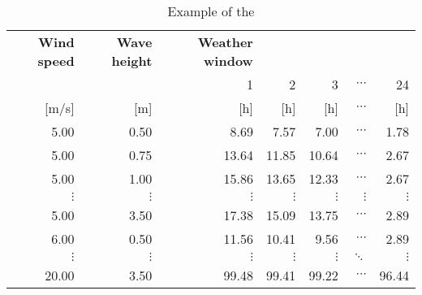 \begin{table}
\label{tab:proba}
\begin{tabular}{rrrrrrr}
\hline
{\bf Wind speed} & {\bf Wave height} & {\bf Weather window} &            &            &            &            \\

           &            &          1 &          2 &          3 &  $\cdots$ &         24 \\

     [m/s] &        [m] &        [h] &        [h] &        [h] &  $\cdots$ &        [h] \\

      5.00 &       0.50 &       8.69 &       7.57 &       7.00 &  $\cdots$ &       1.78 \\

      5.00 &       0.75 &      13.64 &      11.85 &      10.64 &  $\cdots$ &       2.67 \\

      5.00 &       1.00 &      15.86 &      13.65 &      12.33 &  $\cdots$ &       2.67 \\

 $\vdots$ &  $\vdots$ &  $\vdots$ &  $\vdots$ &  $\vdots$ &  $\vdots$ &  $\vdots$ \\

      5.00 &       3.50 &      17.38 &      15.09 &      13.75 &  $\cdots$ &       2.89 \\

      6.00 &       0.50 &      11.56 &      10.41 &       9.56 &  $\cdots$ &       2.89 \\

 $\vdots$ &  $\vdots$ &  $\vdots$ &  $\vdots$ &  $\vdots$ & $\ddots$           &  $\vdots$ \\

     20.00 &       3.50 &      99.48 &      99.41 &      99.22 &  $\cdots$ &      96.44 \\
\hline
\end{tabular}  

\caption{Example of the }
\end{table}